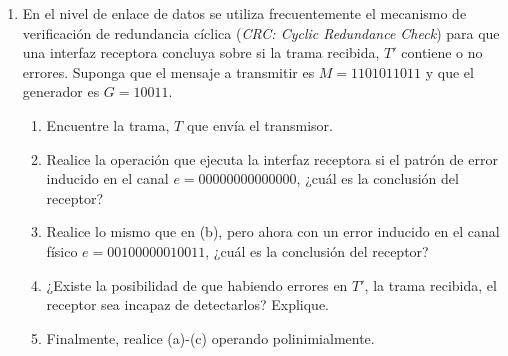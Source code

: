 \begin{enumerate}
    \item En el nivel de enlace de datos se utiliza frecuentemente el mecanismo de verificaci\'on de redundancia c\'iclica (\textit{CRC: Cyclic 
    Redundance Check}) para que una interfaz receptora concluya sobre si la trama recibida, \(T'\) contiene o no errores. Suponga que el mensaje
    a transmitir es \(M=1101011011\) y que el generador es \(G=10011\).
    \begin{enumerate}
        \item Encuentre la trama, \(T\) que env\'ia el transmisor.
        \item Realice la operaci\'on que ejecuta la interfaz receptora si el patr\'on de error inducido en el canal \(e=00000000000000\), ¿cu\'al 
        es la conclusi\'on del receptor?
        \item Realice lo mismo que en (b), pero ahora con un error inducido en el canal f\'isico \(e=00100000010011\), ¿cu\'al es la conclusi\'on
        del receptor?
        \item ¿Existe la posibilidad de que habiendo errores en \(T'\), la trama recibida, el receptor sea incapaz de detectarlos? Explique.
        \item Finalmente, realice (a)-(c) operando polinimialmente.
    \end{enumerate}
\end{enumerate}